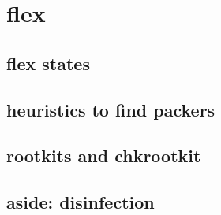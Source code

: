 

\section{flex}


\subsection{flex states}


\subsection{heuristics to find packers}



\subsection{rootkits and chkrootkit}


\subsection{aside: disinfection}
